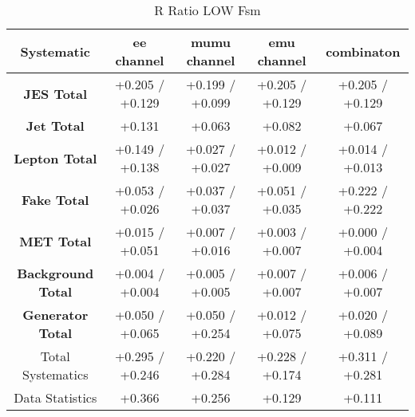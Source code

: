 \begin{table}[htbp]
\scriptsize
  \begin{center} 
  \begin{tabular}{|c|c|c|c|c|}
  \hline
     Systematic                            &  ee channel&  mumu channel&  emu channel&  combinaton\\
 \hline
\textbf{JES Total}                    &+0.205   / +0.129   & +0.199   / +0.099   & +0.205   / +0.129   & +0.205   / +0.129  \\
\textbf{Jet Total}                    &+0.131              & +0.063              & +0.082              & +0.067             \\
\textbf{Lepton Total}                 &+0.149   / +0.138   & +0.027   / +0.027   & +0.012   / +0.009   & +0.014   / +0.013  \\
\textbf{Fake Total}                   &+0.053   / +0.026   & +0.037   / +0.037   & +0.051   / +0.035   & +0.222   / +0.222  \\
\textbf{MET Total}                    &+0.015   / +0.051   & +0.007   / +0.016   & +0.003   / +0.007   & +0.000   / +0.004  \\
\textbf{Background Total}             &+0.004   / +0.004   & +0.005   / +0.005   & +0.007   / +0.007   & +0.006   / +0.007  \\
\textbf{Generator Total}              &+0.050   / +0.065   & +0.050   / +0.254   & +0.012   / +0.075   & +0.020   / +0.089  \\
  \hline
  \hline
Total Systematics                     &+0.295   / +0.246   & +0.220   / +0.284   & +0.228   / +0.174   & +0.311   / +0.281  \\
Data Statistics                       &+0.366              & +0.256              & +0.129              & +0.111             \\
  \hline
  \end{tabular}
  \end{center} 
  \label{tab:fsm_nominal_rratio_low}
  \caption{R Ratio LOW Fsm}
\end{table}


